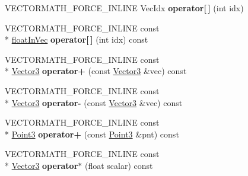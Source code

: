 \begin{DoxyCompactItemize}
\item 
\hypertarget{class_vectormath_1_1_aos_1_1_vector3_ac7873beab7df5fc972c52b45f78cebaa}{V\+E\+C\+T\+O\+R\+M\+A\+T\+H\+\_\+\+F\+O\+R\+C\+E\+\_\+\+I\+N\+L\+I\+N\+E Vec\+Idx {\bfseries operator\mbox{[}$\,$\mbox{]}} (int idx)}\label{class_vectormath_1_1_aos_1_1_vector3_ac7873beab7df5fc972c52b45f78cebaa}

\item 
\hypertarget{class_vectormath_1_1_aos_1_1_vector3_a6088b8a85f69878ef584c98b13c50351}{V\+E\+C\+T\+O\+R\+M\+A\+T\+H\+\_\+\+F\+O\+R\+C\+E\+\_\+\+I\+N\+L\+I\+N\+E const \\*
\hyperlink{class_vectormath_1_1float_in_vec}{float\+In\+Vec} {\bfseries operator\mbox{[}$\,$\mbox{]}} (int idx) const }\label{class_vectormath_1_1_aos_1_1_vector3_a6088b8a85f69878ef584c98b13c50351}

\item 
\hypertarget{class_vectormath_1_1_aos_1_1_vector3_a2d5d07c49d38651fbeb56470d465913f}{V\+E\+C\+T\+O\+R\+M\+A\+T\+H\+\_\+\+F\+O\+R\+C\+E\+\_\+\+I\+N\+L\+I\+N\+E const \\*
\hyperlink{class_vectormath_1_1_aos_1_1_vector3}{Vector3} {\bfseries operator+} (const \hyperlink{class_vectormath_1_1_aos_1_1_vector3}{Vector3} \&vec) const }\label{class_vectormath_1_1_aos_1_1_vector3_a2d5d07c49d38651fbeb56470d465913f}

\item 
\hypertarget{class_vectormath_1_1_aos_1_1_vector3_ac1f153f39a0ed89f5b6fd3b346329f59}{V\+E\+C\+T\+O\+R\+M\+A\+T\+H\+\_\+\+F\+O\+R\+C\+E\+\_\+\+I\+N\+L\+I\+N\+E const \\*
\hyperlink{class_vectormath_1_1_aos_1_1_vector3}{Vector3} {\bfseries operator-\/} (const \hyperlink{class_vectormath_1_1_aos_1_1_vector3}{Vector3} \&vec) const }\label{class_vectormath_1_1_aos_1_1_vector3_ac1f153f39a0ed89f5b6fd3b346329f59}

\item 
\hypertarget{class_vectormath_1_1_aos_1_1_vector3_ae3416a1846e37dbd8c427f7386d23036}{V\+E\+C\+T\+O\+R\+M\+A\+T\+H\+\_\+\+F\+O\+R\+C\+E\+\_\+\+I\+N\+L\+I\+N\+E const \\*
\hyperlink{class_vectormath_1_1_aos_1_1_point3}{Point3} {\bfseries operator+} (const \hyperlink{class_vectormath_1_1_aos_1_1_point3}{Point3} \&pnt) const }\label{class_vectormath_1_1_aos_1_1_vector3_ae3416a1846e37dbd8c427f7386d23036}

\item 
\hypertarget{class_vectormath_1_1_aos_1_1_vector3_a164394a5aeef3ea31688e6cc75deb945}{V\+E\+C\+T\+O\+R\+M\+A\+T\+H\+\_\+\+F\+O\+R\+C\+E\+\_\+\+I\+N\+L\+I\+N\+E const \\*
\hyperlink{class_vectormath_1_1_aos_1_1_vector3}{Vector3} {\bfseries operator$\ast$} (float scalar) const }\label{class_vectormath_1_1_aos_1_1_vector3_a164394a5aeef3ea31688e6cc75deb945}


\end{DoxyCompactItemize}
